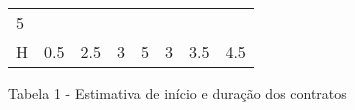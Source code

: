 \documentclass[11pt]{article}
\begin{document}
\begin{longtable}[]{@{}llllllll@{}}
\begin{minipage}[t]{0.04\columnwidth}
5\strut
\end{minipage}\tabularnewline
\begin{minipage}[t]{0.04\columnwidth}\raggedright\strut
H\strut
\end{minipage} & \begin{minipage}[t]{0.04\columnwidth}\raggedright\strut
0.5\strut
\end{minipage} & \begin{minipage}[t]{0.04\columnwidth}\raggedright\strut
2.5\strut
\end{minipage} & \begin{minipage}[t]{0.04\columnwidth}\raggedright\strut
3\strut
\end{minipage} & \begin{minipage}[t]{0.04\columnwidth}\raggedright\strut
5\strut
\end{minipage} & \begin{minipage}[t]{0.04\columnwidth}\raggedright\strut
3\strut
\end{minipage} & \begin{minipage}[t]{0.04\columnwidth}\raggedright\strut
3.5\strut
\end{minipage} & \begin{minipage}[t]{0.04\columnwidth}\raggedright\strut
4.5\strut
\end{minipage}\tabularnewline
\bottomrule
\end{longtable}

Tabela 1 - Estimativa de início e duração dos contratos
\end{document}
